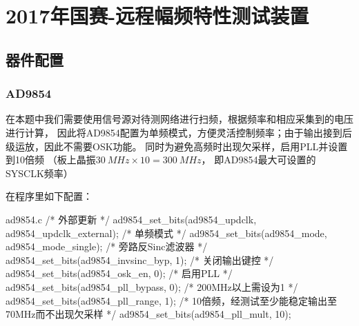 \section{2017年国赛-远程幅频特性测试装置}
\subsection{器件配置}
\subsubsection{AD9854}
在本题中我们需要使用信号源对待测网络进行扫频，根据频率和相应采集到的电压进行计算，
因此将AD9854配置为单频模式，方便灵活控制频率；由于输出接到后级运放，因此不需要OSK功能。
同时为避免高频时出现欠采样，启用PLL并设置到10倍频
（板上晶振$\SI{30}{MHz}\times 10 = \SI{300}{MHz}$，
即AD9854最大可设置的SYSCLK频率）

在程序里如下配置：

\begin{cbox}{ad9854.c}
  /* 外部更新 */
  ad9854_set_bits(ad9854_updclk, ad9854_updclk_external);
  /* 单频模式 */
  ad9854_set_bits(ad9854_mode, ad9854_mode_single);
  /* 旁路反Sinc滤波器 */
  ad9854_set_bits(ad9854_invsinc_byp, 1);
  /* 关闭输出键控 */
  ad9854_set_bits(ad9854_osk_en, 0);
  /* 启用PLL */
  ad9854_set_bits(ad9854_pll_bypass, 0);
  /* 200MHz以上需设为1 */
  ad9854_set_bits(ad9854_pll_range, 1);
  /* 10倍频，经测试至少能稳定输出至70MHz而不出现欠采样 */
  ad9854_set_bits(ad9854_pll_mult, 10);
\end{cbox}
